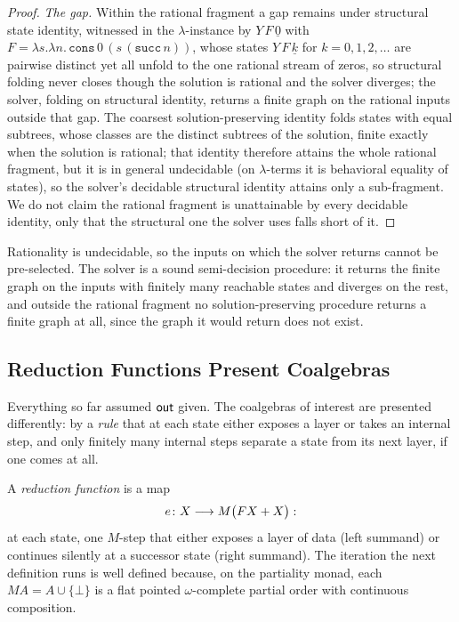\begin{proof}
  \emph{The gap.} Within the rational fragment a gap remains under structural state identity, witnessed in the $\lambda$-instance by $Y\,F\,\underline{0}$ with $F = \lambda s.\lambda n.\,\mathtt{cons}\,0\,(s\,(\mathtt{succ}\,n))$, whose states $Y\,F\,\underline{k}$ for $k = 0, 1, 2, \dots$ are pairwise distinct yet all unfold to the one rational stream of zeros, so structural folding never closes though the solution is rational and the solver diverges; the solver, folding on structural identity, returns a finite graph on the rational inputs outside that gap. The coarsest solution-preserving identity folds states with equal subtrees, whose classes are the distinct subtrees of the solution, finite exactly when the solution is rational; that identity therefore attains the whole rational fragment, but it is in general undecidable (on $\lambda$-terms it is behavioral equality of states), so the solver's decidable structural identity attains only a sub-fragment. We do not claim the rational fragment is unattainable by every decidable identity, only that the structural one the solver uses falls short of it.
\end{proof}

\noindent Rationality is undecidable, so the inputs on which the solver returns cannot be pre-selected. The solver is a sound semi-decision procedure: it returns the finite graph on the inputs with finitely many reachable states and diverges on the rest, and outside the rational fragment no solution-preserving procedure returns a finite graph at all, since the graph it would return does not exist.

\subsection{Reduction Functions Present Coalgebras}\label{sec:reductions}

Everything so far assumed $\mathsf{out}$ given. The coalgebras of interest are presented differently:
by a \emph{rule} that at each state either exposes a layer or takes an internal step, and only finitely many internal steps separate a state from its next layer, if one comes at all.

\begin{definition}\label{def:reduction}
  A \emph{reduction function} is a map
  \[
    e \colon X \longrightarrow M\big(F X + X\big):
  \]
  at each state, one $M$-step that either exposes a layer of data (left summand) or continues silently at a successor state (right summand). The iteration the next definition runs is well defined because, on the partiality monad, each $M A = A \cup \{\bot\}$ is a flat pointed $\omega$-complete partial order with continuous composition.
\end{definition}

